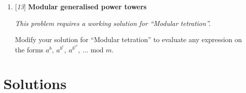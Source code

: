 \begin{enumerate}[label=\textbf{\arabic*}.]
\item {[\textit{13}]} \textbf{Modular generalised power towers}

{\small\textit{This problem requires a working
solution for ``Modular tetration''.}}

Modify your solution for ``Modular tetration'' to
evaluate any expression on the forms
$a^b,~a^{b^c},~a^{b^{c^d}},~\ldots \text{ mod } m$.



\end{enumerate}



\chapter{Solutions}
\label{chap:Solutions}


